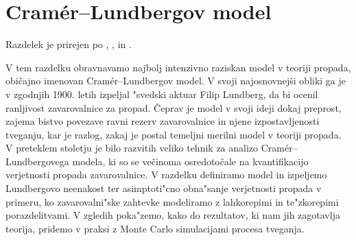 \documentclass[12pt, a4paper, reqno]{amsart}
\theoremstyle{definition}
\theoremstyle{plain}
\newcommand{\R}{\mathbb{R}}
\newcommand{\1}{\mathds{1}}
\begin{document}
%
%

    \newpage

\section{Cramér--Lundbergov model}
    \noindent
    Razdelek je prirejen po \cite{3}, \cite{4},  \cite{5} in \cite{9}.

    V tem razdelku obravnavamo najbolj intenzivno raziskan model v teoriji propada, običajno imenovan 
    Cramér--Lundbergov model. V svoji najosnovnejši obliki 
    ga je v zgodnjih 1900. letih izpeljal "svedski aktuar Filip Lundberg, da bi ocenil ranljivost 
    zavarovalnice za propad. Čeprav je model v svoji ideji dokaj preprost, 
     zajema bistvo povezave ravni rezerv zavarovalnice in njene izpostavljenosti tveganju, 
    kar je razlog, zakaj je postal temeljni merilni model v teoriji propada.
    V preteklem stoletju je bilo razvitih veliko tehnik za analizo Cramér--Lundbergovega modela, 
    ki so se večinoma osredotočale na kvantifikacijo verjetnosti propada zavarovalnice. V razdelku definiramo 
    model in izpeljemo Lundbergovo neenakost ter asimptoti"cno obna"sanje verjetnosti propada v primeru, ko 
    zavarovalni"ske zahtevke modeliramo z lahkorepimi in te"zkorepimi porazdelitvami. V zgledih 
    poka"zemo, kako do rezultatov, ki nam jih zagotavlja teorija, pridemo v praksi z Monte Carlo 
    simulacijami procesa tveganja.
\end{document}
